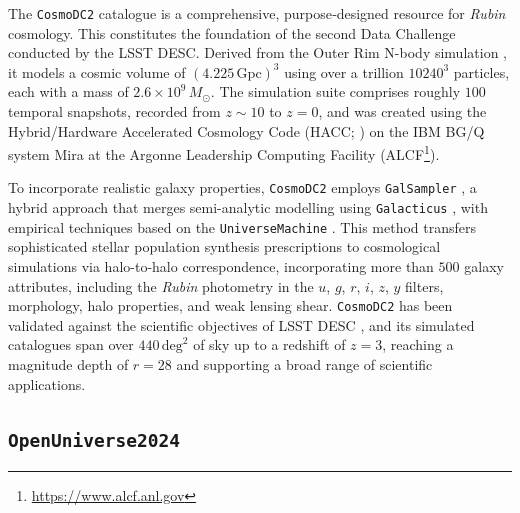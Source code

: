 The \texttt{CosmoDC2} catalogue \citep{2019ApJS..245...26K} is a comprehensive, purpose‐designed resource for \textit{Rubin} cosmology. This constitutes the foundation of the second Data Challenge \citep[DC2;][]{2021ApJS..253...31L} conducted by the LSST DESC. Derived from the Outer Rim N-body simulation \citep{2019ApJS..245...16H}, it models a cosmic volume of \( \left( 4.225\, \mathrm{Gpc} \right)^3 \) using over a trillion \(10240^3\) particles, each with a mass of \(2.6 \times 10^9 \, M_{\odot}\). The simulation suite comprises roughly \(100\) temporal snapshots, recorded from \(z \sim 10\) to \(z = 0\), and was created using the Hybrid/Hardware Accelerated Cosmology Code (HACC; \citealp{2016NewA...42...49H}) on the IBM BG/Q system Mira at the Argonne Leadership Computing Facility (ALCF\footnote{\url{https://www.alcf.anl.gov}}).

To incorporate realistic galaxy properties, \texttt{CosmoDC2} employs \texttt{GalSampler} \citep{2020MNRAS.495.5040H}, a hybrid approach that merges semi-analytic modelling using \texttt{Galacticus} \citep{2012MNRAS.419.3590B}, with empirical techniques based on the \texttt{UniverseMachine} \citep{2019MNRAS.488.3143B}. This method transfers sophisticated stellar population synthesis prescriptions to cosmological simulations via halo-to-halo correspondence, incorporating more than \(500\) galaxy attributes, including the \textit{Rubin} photometry in the \(u\), \(g\), \(r\), \(i\), \(z\), \(y\) filters, morphology, halo properties, and weak lensing shear. \texttt{CosmoDC2} has been validated against the scientific objectives of LSST DESC \citep{2022OJAp....5E...1K}, and its simulated catalogues span over \(440 \,\mathrm{deg}^2\) of sky up to a redshift of \(z = 3\), reaching a magnitude depth of \(r = 28 \) and supporting a broad range of scientific applications.

\subsection{\texttt{OpenUniverse2024}}


